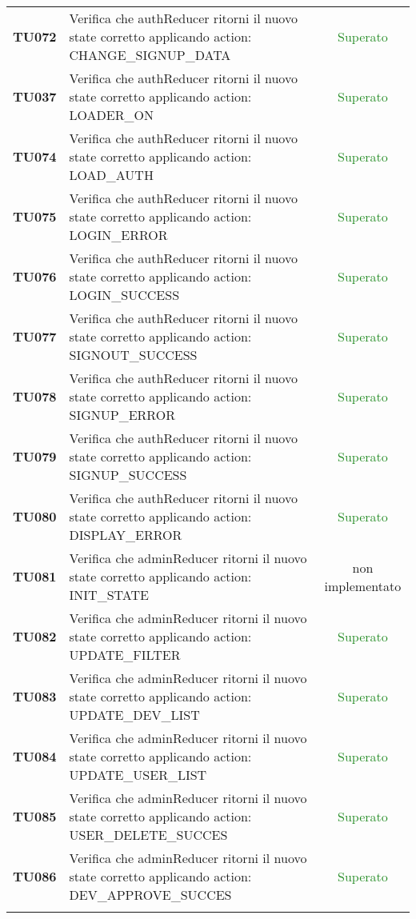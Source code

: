 \begin{tabularx}{\textwidth}{cXc}
	\textbf{TU072} & Verifica che authReducer ritorni il nuovo state corretto applicando action: CHANGE\_SIGNUP\_DATA & \textcolor{ForestGreen}{Superato} \\
	\textbf{TU037} & Verifica che authReducer ritorni il nuovo state corretto applicando action: LOADER\_ON & \textcolor{ForestGreen}{Superato} \\
	\textbf{TU074} & Verifica che authReducer ritorni il nuovo state corretto applicando action: LOAD\_AUTH & \textcolor{ForestGreen}{Superato} \\
	\textbf{TU075} & Verifica che authReducer ritorni il nuovo state corretto applicando action: LOGIN\_ERROR & \textcolor{ForestGreen}{Superato} \\
	\textbf{TU076} & Verifica che authReducer ritorni il nuovo state corretto applicando action: LOGIN\_SUCCESS & \textcolor{ForestGreen}{Superato} \\
	\textbf{TU077} & Verifica che authReducer ritorni il nuovo state corretto applicando action: SIGNOUT\_SUCCESS & \textcolor{ForestGreen}{Superato} \\
	\textbf{TU078} & Verifica che authReducer ritorni il nuovo state corretto applicando action: SIGNUP\_ERROR & \textcolor{ForestGreen}{Superato} \\
	\textbf{TU079} & Verifica che authReducer ritorni il nuovo state corretto applicando action: SIGNUP\_SUCCESS & \textcolor{ForestGreen}{Superato} \\
	\textbf{TU080} & Verifica che authReducer ritorni il nuovo state corretto applicando action: DISPLAY\_ERROR & \textcolor{ForestGreen}{Superato} \\
	\textbf{TU081} & Verifica che adminReducer ritorni il nuovo state corretto applicando action: INIT\_STATE & non implementato \\
	\textbf{TU082} & Verifica che adminReducer ritorni il nuovo state corretto applicando action: UPDATE\_FILTER & \textcolor{ForestGreen}{Superato} \\
	\textbf{TU083} & Verifica che adminReducer ritorni il nuovo state corretto applicando action: UPDATE\_DEV\_LIST & \textcolor{ForestGreen}{Superato} \\
	\textbf{TU084} & Verifica che adminReducer ritorni il nuovo state corretto applicando action: UPDATE\_USER\_LIST & \textcolor{ForestGreen}{Superato} \\
	\textbf{TU085} & Verifica che adminReducer ritorni il nuovo state corretto applicando action: USER\_DELETE\_SUCCES & \textcolor{ForestGreen}{Superato} \\
	\textbf{TU086} & Verifica che adminReducer ritorni il nuovo state corretto applicando action: DEV\_APPROVE\_SUCCES & \textcolor{ForestGreen}{Superato} \\
	
	
	\rowcolor{white}
	\caption{Test di unità}
	\label{tab:tabellatestunità}
\end{tabularx}

